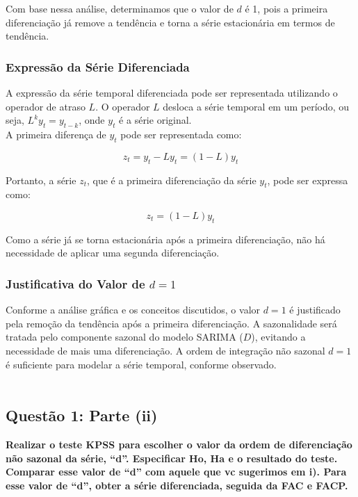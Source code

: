 \documentclass[a4paper, 12pt]{article}
\begin{document}
Com base nessa análise, determinamos que o valor de \(d\) é 1, pois a primeira diferenciação já remove a tendência e torna a série estacionária em termos de tendência.

\subsubsection{Expressão da Série Diferenciada}

A expressão da série temporal diferenciada pode ser representada utilizando o operador de atraso \(L\). O operador \(L\) desloca a série temporal em um período, ou seja, \(L^k y_t = y_{t-k}\), onde \(y_t\) é a série original.\\

A primeira diferença de \(y_t\) pode ser representada como:

\[
z_t = y_t - L y_t = (1 - L) y_t
\]

Portanto, a série \(z_t\), que é a primeira diferenciação da série \(y_t\), pode ser expressa como:

\[
z_t = (1 - L) y_t
\]

\noindent Como a série já se torna estacionária após a primeira diferenciação, não há necessidade de aplicar uma segunda diferenciação.

\subsubsection{Justificativa do Valor de \(d = 1\)}

Conforme a análise gráfica e os conceitos discutidos, o valor \(d = 1\) é justificado pela remoção da tendência após a primeira diferenciação. A sazonalidade será tratada pelo componente sazonal do modelo SARIMA (\(D\)), evitando a necessidade de mais uma diferenciação. A ordem de integração não sazonal \(d = 1\) é suficiente para modelar a série temporal, conforme observado.\\\\


\subsection{Questão 1: Parte (ii)}
\textbf{Realizar o teste KPSS para escolher o valor da ordem de diferenciação não sazonal da
série, “d”. Especificar Ho, Ha e o resultado do teste. Comparar esse valor de “d” com aquele
que vc sugerimos em i). Para esse valor de “d”, obter a série diferenciada, seguida da FAC e
FACP.}
\end{document}
